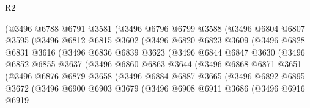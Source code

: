 \begin{lexlean}{R2}
\begin{coremodule}
                (@3496
                  @6788
                  @6791
                  @3581
                  (@3496
                    @6796
                    @6799
                    @3588
                    (@3496
                      @6804
                      @6807
                      @3595
                      (@3496
                        @6812
                        @6815
                        @3602
                        (@3496
                          @6820
                          @6823
                          @3609
                          (@3496
                            @6828
                            @6831
                            @3616
                            (@3496
                              @6836
                              @6839
                              @3623
                              (@3496
                                @6844
                                @6847
                                @3630
                                (@3496
                                  @6852
                                  @6855
                                  @3637
                                  (@3496
                                    @6860
                                    @6863
                                    @3644
                                    (@3496
                                      @6868
                                      @6871
                                      @3651
                                      (@3496
                                        @6876
                                        @6879
                                        @3658
                                        (@3496
                                          @6884
                                          @6887
                                          @3665
                                          (@3496
                                            @6892
                                            @6895
                                            @3672
                                            (@3496
                                              @6900
                                              @6903
                                              @3679
                                              (@3496
                                                @6908
                                                @6911
                                                @3686
                                                (@3496
                                                  @6916
                                                  @6919

\end{coremodule}
\end{lexlean}
